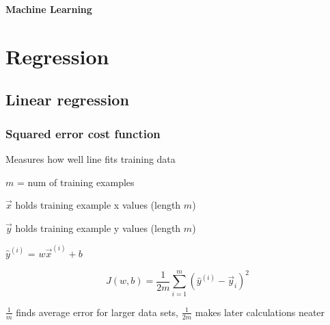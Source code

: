 \documentclass[12pt]{article}
\begin{document}
\newcommand*\dif{\mathop{}\!\mathrm{d}}

\newenvironment{myitemize}
{ \begin{itemize}
    \setlength{\itemsep}{0pt}
    \setlength{\parskip}{0pt}
    \setlength{\parsep}{0pt}     }
{ \end{itemize}                  } 

\newenvironment{myenumerate}
{ \begin{enumerate}
    \setlength{\itemsep}{0pt}
    \setlength{\parskip}{0pt}
    \setlength{\parsep}{0pt}     }
{ \end{enumerate}                  } 

\begin{titlepage}
\begin{center}
\vspace*{2cm}
\begin{huge}\textbf{Machine Learning}\end{huge}
\end{center}
\end{titlepage}

\tableofcontents


\pagebreak

\section{Regression}

\subsection{Linear regression}
\subsubsection{Squared error cost function}

Measures how well line fits training data

$m$ = num of training examples

$\vec{x}$ holds training example x values (length $m$)

$\vec{y}$ holds training example y values (length $m$)

${\hat y}^{(i)}$ = $w\vec{x}^{(i)} + b$

\[ J(w,b) = \frac{1}{2m} \sum_{i=1}^m ({\hat y}^{(i)} - \vec{y}_i)^2 \]

$\frac{1}{m}$ finds average error for larger data sets, $\frac{1}{2m}$ makes later calculations neater
\end{document}
